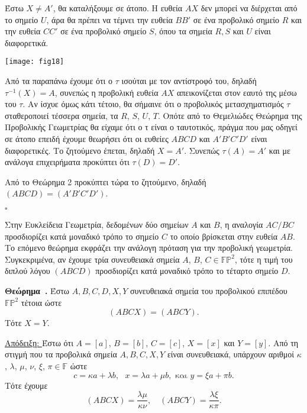 \documentclass[12pt, a4paper]{book}
\newcounter{theorem}[section]
\newenvironment{theorem}[1][]{\refstepcounter{theorem}\par\medskip
   \textbf{Θεώρημα~\thetheorem. #1} \rmfamily}{\medskip}
\begin{document}
Έστω $X \neq A'$, θα καταλήξουμε σε άτοπο. Η ευθεία $AX$ δεν μπορεί να διέρχεται από το σημείο $U$, άρα θα πρέπει να τέμνει την ευθεία $BB'$ σε ένα προβολικό σημείο  $R$ και την ευθεία $CC'$ σε ένα προβολικό σημείο $S$, όπου τα σημεία $R,S$ και $U$ είναι διαφορετικά.	

\begin{center}
\texttt{[image: fig18]}
\end{center}

Από τα παραπάνω έχουμε ότι ο $τ$ ισούται με τον αντίστροφό του, δηλαδή $τ^{-1}(X)=Α$, συνεπώς η προβολική ευθεία $ΑX$ απεικονίζεται στον εαυτό της μέσω του $τ$. Αν ίσχυε όμως κάτι τέτοιο, θα σήμαινε ότι ο προβολικός μετασχηματισμός $τ$ σταθεροποιεί τέσσερα σημεία, τα $R$, $S$, $U$, $T$. Οπότε από το Θεμελιώδες Θεώρημα της Προβολικής Γεωμετρίας θα είχαμε ότι ο τ είναι ο ταυτοτικός, πράγμα που μας οδηγεί σε άτοπο επειδή έχουμε θεωρήσει ότι οι ευθείες $ABCD$ και $A'B'C'D'$ είναι διαφορετικές. Το ζητούμενο έπεται, δηλαδή $X=A'$. Συνεπώς $τ(Α)=Α'$ και με ανάλογα επιχειρήματα προκύπτει ότι $τ(D)=D'$. 

Από το Θεώρημα 2 προκύπτει τώρα το ζητούμενο, δηλαδή $(ABCD)=(A'B'C'D')$.
  \begin{flushright}
  $\square$
  \end{flushright}
  
Στην Ευκλείδεια Γεωμετρία, δεδομένων δύο σημείων $A$ και $B$, η αναλογία $AC/BC$ προσδιορίζει κατά μοναδικό τρόπο το σημείο $C$ το οποίο βρίσκεται στην ευθεία $AB$. Το επόμενο θεώρημα εκφράζει την ανάλογη πρόταση για την προβολική γεωμετρία. Συγκεκριμένα, αν έχουμε τρία συνευθειακά σημεία $A$, $B$, $C \in \mathbb{F}\mathbb{P}^2$, τότε η τιμή του διπλού λόγου $(ABCD)$ προσδιορίζει κατά μοναδικό τρόπο το τέταρτο σημείο $D$.

\begin{theorem}
Έστω $A, B, C, D, X, Y$ συνευθειακά σημεία του προβολικού επιπέδου $\mathbb{F}\mathbb{P}^2$ τέτοια ώστε
\begin{displaymath}
(ABCX)=(ABCY).
\end{displaymath}
Τότε $X=Y$.
\end{theorem}

\underline{Απόδειξη: } Έστω ότι $A=[a]$, $B=[b]$, $C=[c]$, $X=[x]$ και $Y=[y]$. Από τη στιγμή που τα προβολικά σημεία $A, B, C, X, Y$ είναι συνευθειακά, υπάρχουν αριθμοί $κ$, $λ$, $μ$, $ν$, $ξ$, $π \in \mathbb{F}$ ώστε
\begin{displaymath}
c=κa+λb,\text{  } x=λa+μb, \text{ και } y=ξa+πb.
\end{displaymath}
Τότε έχουμε 
\begin{displaymath}
(ABCX)=\frac{λμ}{κν}, \quad (ABCY)=\frac{λξ}{κπ}.
\end{displaymath}
\end{document}
